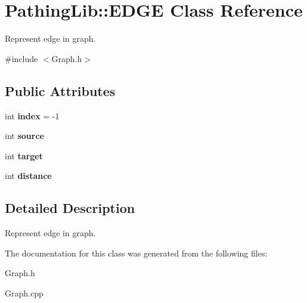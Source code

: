 \hypertarget{class_pathing_lib_1_1_e_d_g_e}{}\section{Pathing\+Lib\+:\+:E\+D\+GE Class Reference}
\label{class_pathing_lib_1_1_e_d_g_e}


Represent edge in graph.  




{\ttfamily \#include $<$Graph.\+h$>$}

\subsection*{Public Attributes}
\begin{DoxyCompactItemize}
\item 
int {\bfseries index} = -\/1\hypertarget{class_pathing_lib_1_1_e_d_g_e_a522e19f8063ffd3dfe1db9f81657fa5f}{}\label{class_pathing_lib_1_1_e_d_g_e_a522e19f8063ffd3dfe1db9f81657fa5f}

\item 
int {\bfseries source}\hypertarget{class_pathing_lib_1_1_e_d_g_e_a6ef168b1c84fbdc7c15852b4903b979d}{}\label{class_pathing_lib_1_1_e_d_g_e_a6ef168b1c84fbdc7c15852b4903b979d}

\item 
int {\bfseries target}\hypertarget{class_pathing_lib_1_1_e_d_g_e_aed376bc9f8d3695139ae71ecc2c20af7}{}\label{class_pathing_lib_1_1_e_d_g_e_aed376bc9f8d3695139ae71ecc2c20af7}

\item 
int {\bfseries distance}\hypertarget{class_pathing_lib_1_1_e_d_g_e_a5eee63907fde58eb852fec412adc46d9}{}\label{class_pathing_lib_1_1_e_d_g_e_a5eee63907fde58eb852fec412adc46d9}

\end{DoxyCompactItemize}


\subsection{Detailed Description}
Represent edge in graph. 

The documentation for this class was generated from the following files\+:\begin{DoxyCompactItemize}
\item 
Graph.\+h\item 
Graph.\+cpp\end{DoxyCompactItemize}
